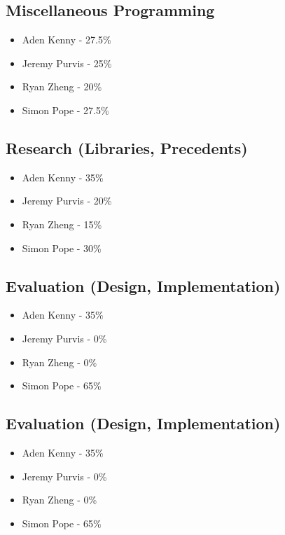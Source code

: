 \documentclass[10pt, journal]{IEEEtran}
\begin{document}
\subsection{Miscellaneous Programming}
\begin{itemize}

\item{Aden Kenny - 27.5\%}
\item{Jeremy Purvis - 25\%}
\item{Ryan Zheng - 20\%}
\item{Simon Pope - 27.5\%}

\end{itemize}

\subsection{Research (Libraries, Precedents)}
\begin{itemize}

\item{Aden Kenny - 35\%}
\item{Jeremy Purvis - 20\%}
\item{Ryan Zheng - 15\%}
\item{Simon Pope - 30\%}

\end{itemize}

\subsection{Evaluation (Design, Implementation)}
\begin{itemize}

\item{Aden Kenny - 35\%}
\item{Jeremy Purvis - 0\%}
\item{Ryan Zheng - 0\%}
\item{Simon Pope - 65\%}

\end{itemize}


\subsection{Evaluation (Design, Implementation)}
\begin{itemize}

\item{Aden Kenny - 35\%}
\item{Jeremy Purvis - 0\%}
\item{Ryan Zheng - 0\%}
\item{Simon Pope - 65\%}

\end{itemize}
\end{document}

